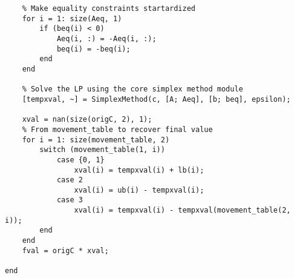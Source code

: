 \documentclass[bwprint, withouttitlepage, openfonts]{mathexpthesis}
\begin{document}
\begin{appendices}
\begin{verbatim}
    % Make equality constraints startardized
    for i = 1: size(Aeq, 1)
        if (beq(i) < 0)
            Aeq(i, :) = -Aeq(i, :);
            beq(i) = -beq(i);
        end
    end
    
    % Solve the LP using the core simplex method module
    [tempxval, ~] = SimplexMethod(c, [A; Aeq], [b; beq], epsilon);

    xval = nan(size(origC, 2), 1);
    % From movement_table to recover final value
    for i = 1: size(movement_table, 2)
        switch (movement_table(1, i))
            case {0, 1}
                xval(i) = tempxval(i) + lb(i);
            case 2
                xval(i) = ub(i) - tempxval(i);
            case 3
                xval(i) = tempxval(i) - tempxval(movement_table(2, i));
        end
    end
    fval = origC * xval;
    
end
    
\end{verbatim}
\end{appendices}
\end{document}
